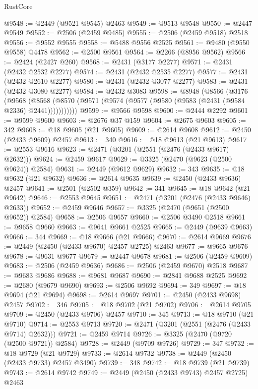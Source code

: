 \begin{lexlean}{RustCore}
\begin{coremodule}
@9548 := @2449 (@9521 @9545) @2463
@9549 := @9513 @9548
@9550 := @2447 @9549
@9552 := @2506 (@2459 @9485)
@9555 := @2506 (@2459 @9518) @2518
@9556 := @9552 @9555
@9558 := @5488 @9556 @2525
@9561 := @9480 (@9550 @9558) @4478
@9562 := @2500 @9561
@9564 := @2266 (@8956 @9562)
@9566 := @2424 (@2427 @260)
@9568 := @2431 (@3177 @2277)
@9571 := @2431 (@2432 @2532 @2277)
@9574 := @2431 (@2432 @2535 @2277)
@9577 := @2431 (@2432 @2610 @2277)
@9580 := @2431 (@2432 @3077 @2277)
@9583 := @2431 (@2432 @3080 @2277)
@9584 := @2432 @3083
@9598 := @8948
    (@8566
      (@3176
        (@9568
          (@8568 (@8570 (@9571 (@9574 (@9577 (@9580 (@9583 (@2431 (@9584 @2336) @2441)))))))))))
@9599 := @9566 @9598
@9600 := @2444 @2292
@9601 := @9599 @9600
@9603 := @2676 @37 @159
@9604 := @2675 @9603
@9605 := 342
@9608 := @18 @9605 (@21 @9605)
@9609 := @2614 @9608
@9612 := @2450 (@2433 @9609) @2457
@9613 := 340
@9616 := @18 @9613 (@21 @9613)
@9617 := @2553 @9616
@9623 := @2471 (@3201 (@2551 (@2476 (@2433 @9617) @2632)))
@9624 := @2459 @9617
@9629 := @3325 (@2470 (@9623 (@2500 @9624)) @2584)
@9631 := @2449 (@9612 @9629)
@9632 := 343
@9635 := @18 @9632 (@21 @9632)
@9636 := @2614 @9635
@9639 := @2450 (@2433 @9636) @2457
@9641 := @2501 (@2502 @359)
@9642 := 341
@9645 := @18 @9642 (@21 @9642)
@9646 := @2553 @9645
@9651 := @2471 (@3201 (@2476 (@2433 @9646) @2633))
@9652 := @2459 @9646
@9657 := @3325 (@2470 (@9651 (@2500 @9652)) @2584)
@9658 := @2506 @9657
@9660 := @2506 @3490 @2518
@9661 := @9658 @9660
@9663 := @9641 @9661 @2525
@9665 := @2449 (@9639 @9663)
@9666 := 344
@9669 := @18 @9666 (@21 @9666)
@9670 := @2614 @9669
@9676 := @2449 (@2450 (@2433 @9670) @2457 @2725) @2463
@9677 := @9665 @9676
@9678 := @9631 @9677
@9679 := @2447 @9678
@9681 := @2506 (@2459 @9609)
@9683 := @2506 (@2459 @9636)
@9686 := @2506 (@2459 @9670) @2518
@9687 := @9683 @9686
@9688 := @9681 @9687
@9690 := @2841 @9688 @2525
@9692 := @2680 (@9679 @9690)
@9693 := @2506 @9692
@9694 := 349
@9697 := @18 @9694 (@21 @9694)
@9698 := @2614 @9697
@9701 := @2450 (@2433 @9698) @2457
@9702 := 346
@9705 := @18 @9702 (@21 @9702)
@9706 := @2614 @9705
@9709 := @2450 (@2433 @9706) @2457
@9710 := 345
@9713 := @18 @9710 (@21 @9710)
@9714 := @2553 @9713
@9720 := @2471 (@3201 (@2551 (@2476 (@2433 @9714) @2632)))
@9721 := @2459 @9714
@9726 := @3325 (@2470 (@9720 (@2500 @9721)) @2584)
@9728 := @2449 (@9709 @9726)
@9729 := 347
@9732 := @18 @9729 (@21 @9729)
@9733 := @2614 @9732
@9738 := @2449 (@2450 (@2433 @9733) @2457 @3490)
@9739 := 348
@9742 := @18 @9739 (@21 @9739)
@9743 := @2614 @9742
@9749 := @2449 (@2450 (@2433 @9743) @2457 @2725) @2463

\end{coremodule}
\end{lexlean}
